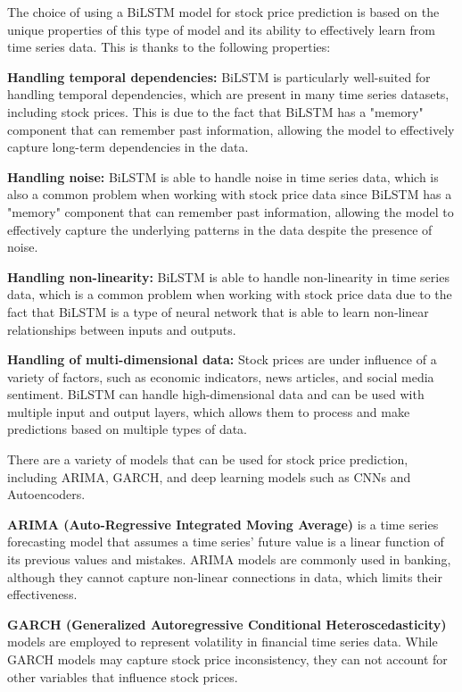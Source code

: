 \documentclass[a4paper]{article}
\begin{document}
The choice of using a BiLSTM model for stock price prediction is based on the unique properties of this type of model and its ability to effectively learn from time series data. This is thanks to the following properties:

\textbf{Handling temporal dependencies:} BiLSTM is particularly well-suited for handling temporal dependencies, which are present in many time series datasets, including stock prices. This is due to the fact that BiLSTM has a "memory" component that can remember past information, allowing the model to effectively capture long-term dependencies in the data.

\textbf{Handling noise:} BiLSTM is able to handle noise in time series data, which is also a common problem when working with stock price data since BiLSTM has a "memory" component that can remember past information, allowing the model to effectively capture the underlying patterns in the data despite the presence of noise.

\textbf{Handling non-linearity:} BiLSTM is able to handle non-linearity in time series data, which is a common problem when working with stock price data due to the fact that BiLSTM is a type of neural network that is able to learn non-linear relationships between inputs and outputs.

\textbf{Handling of multi-dimensional data:} Stock prices are under influence of a variety of factors, such as economic indicators, news articles, and social media sentiment. BiLSTM can handle high-dimensional data and can be used with multiple input and output layers, which allows them to process and make predictions based on multiple types of data.

There are a variety of models that can be used for stock price prediction, including ARIMA, GARCH, and deep learning models such as CNNs and Autoencoders. 

\textbf{ARIMA (Auto-Regressive Integrated Moving Average)} is a time series forecasting model that assumes a time series' future value is a linear function of its previous values and mistakes. ARIMA models are commonly used in banking, although they cannot capture non-linear connections in data, which limits their effectiveness.

\textbf{GARCH (Generalized Autoregressive Conditional Heteroscedasticity)} models are employed to represent volatility in financial time series data. While GARCH models may capture stock price inconsistency, they can not account for other variables that influence stock prices.
\end{document}
